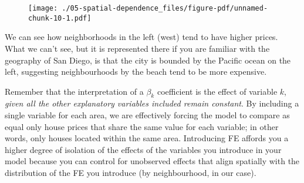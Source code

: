 \documentclass[
  letterpaper,
  krantz2]{style/krantz}
\newenvironment{Shaded}{\begin{snugshade}}{\end{snugshade}}
\newcommand{\AttributeTok}[1]{\textcolor[rgb]{0.40,0.45,0.13}{#1}}
\newcommand{\CommentTok}[1]{\textcolor[rgb]{0.37,0.37,0.37}{#1}}
\newcommand{\FunctionTok}[1]{\textcolor[rgb]{0.28,0.35,0.67}{#1}}
\newcommand{\NormalTok}[1]{\textcolor[rgb]{0.00,0.23,0.31}{#1}}
\newcommand{\OtherTok}[1]{\textcolor[rgb]{0.00,0.23,0.31}{#1}}
\newcommand{\SpecialCharTok}[1]{\textcolor[rgb]{0.37,0.37,0.37}{#1}}
\newcommand{\StringTok}[1]{\textcolor[rgb]{0.13,0.47,0.30}{#1}}
\begin{document}
\begin{Shaded}
\end{Shaded}

\begin{figure}[H]

{\centering \texttt{[image: ./05-spatial-dependence\_files/figure-pdf/unnamed-chunk-10-1.pdf]}

}

\end{figure}

We can see how neighborhoods in the left (west) tend to have higher
prices. What we can't see, but it is represented there if you are
familiar with the geography of San Diego, is that the city is bounded by
the Pacific ocean on the left, suggesting neighbourhoods by the beach
tend to be more expensive.

Remember that the interpretation of a \(\beta_k\) coefficient is the
effect of variable \(k\), \emph{given all the other explanatory
variables included remain constant}. By including a single variable for
each area, we are effectively forcing the model to compare as equal only
house prices that share the same value for each variable; in other
words, only houses located within the same area. Introducing FE affords
you a higher degree of isolation of the effects of the variables you
introduce in your model because you can control for unobserved effects
that align spatially with the distribution of the FE you introduce (by
neighbourhood, in our case).
\end{document}
